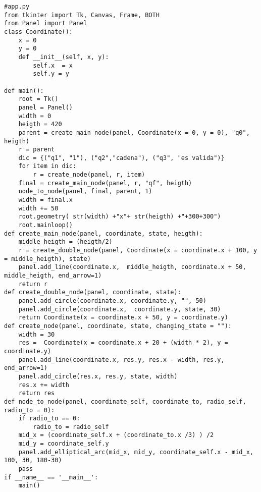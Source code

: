 \documentclass[a4paper]{article}
\begin{document}
            \begin{lstlisting}
#app.py
from tkinter import Tk, Canvas, Frame, BOTH
from Panel import Panel
class Coordinate():
    x = 0
    y = 0
    def __init__(self, x, y):
        self.x  = x
        self.y = y
    
def main():
    root = Tk()
    panel = Panel()
    width = 0
    heigth = 420 
    parent = create_main_node(panel, Coordinate(x = 0, y = 0), "q0", heigth)
    r = parent
    dic = {("q1", "1"), ("q2","cadena"), ("q3", "es valida")}
    for item in dic:
        r = create_node(panel, r, item)
    final = create_main_node(panel, r, "qf", heigth)
    node_to_node(panel, final, parent, 1)
    width = final.x
    width += 50
    root.geometry( str(width) +"x"+ str(heigth) +"+300+300")
    root.mainloop()
def create_main_node(panel, coordinate, state, heigth):
    middle_heigth = (heigth/2)
    r = create_double_node(panel, Coordinate(x = coordinate.x + 100, y = middle_heigth), state)
    panel.add_line(coordinate.x,  middle_heigth, coordinate.x + 50,  middle_heigth, end_arrow=1)
    return r
def create_double_node(panel, coordinate, state):
    panel.add_circle(coordinate.x, coordinate.y, "", 50)
    panel.add_circle(coordinate.x,  coordinate.y, state, 30)
    return Coordinate(x = coordinate.x + 50, y = coordinate.y)
def create_node(panel, coordinate, state, changing_state = ""):
    width = 30
    res =  Coordinate(x = coordinate.x + 20 + (width * 2), y = coordinate.y)
    panel.add_line(coordinate.x, res.y, res.x - width, res.y, end_arrow=1)
    panel.add_circle(res.x, res.y, state, width)
    res.x += width
    return res
def node_to_node(panel, coordinate_self, coordinate_to, radio_self, radio_to = 0):
    if radio_to == 0:
        radio_to = radio_self
    mid_x = (coordinate_self.x + (coordinate_to.x /3) ) /2
    mid_y = coordinate_self.y  
    panel.add_elliptical_arc(mid_x, mid_y, coordinate_self.x - mid_x, 100, 30, 180-30)
    pass
if __name__ == '__main__':
    main()
        \end{lstlisting}
\end{document}
